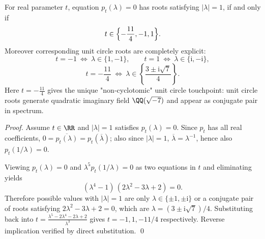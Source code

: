 

\begin{proposition}[Complete classification of unit circle spectral points: only three real parameters touch \texorpdfstring{$|\lambda|=1$}{|lambda|=1}]\label{prop:pom-a4t-unit-circle-spectrum-classification}
For real parameter \(t\), equation \(p_t(\lambda)=0\) has roots satisfying \(|\lambda|=1\), if and only if
\[
t\in\Bigl\{-\frac{11}{4},-1,1\Bigr\}.
\]
Moreover corresponding unit circle roots are completely explicit:
\[
t=-1\ \Longleftrightarrow\ \lambda\in\{1,-1\},
\qquad
t=1\ \Longleftrightarrow\ \lambda\in\{\mathrm{i},-\mathrm{i}\},
\]
\[
t=-\frac{11}{4}
\ \Longleftrightarrow\
\lambda\in\left\{\frac{3\pm \mathrm{i}\sqrt7}{4}\right\}.
\]
Here \(t=-\frac{11}{4}\) gives the unique "non-cyclotomic" unit circle touchpoint: unit circle roots generate quadratic imaginary field \(\QQ(\sqrt{-7})\) and appear as conjugate pair in spectrum.
\end{proposition}
\begin{proof}
Assume \(t\in\RR\) and \(|\lambda|=1\) satisfies \(p_t(\lambda)=0\).
Since \(p_t\) has all real coefficients, \(0=\overline{p_t(\lambda)}=p_t(\overline\lambda)\); also since \(|\lambda|=1\), \(\overline\lambda=\lambda^{-1}\), hence also \(p_t(1/\lambda)=0\).
\par
Viewing \(p_t(\lambda)=0\) and \(\lambda^5p_t(1/\lambda)=0\) as two equations in \(t\) and eliminating yields
\[
(\lambda^4-1)\,(2\lambda^2-3\lambda+2)=0.
\]
Therefore possible values with \(|\lambda|=1\) are only \(\lambda\in\{\pm1,\pm\mathrm{i}\}\) or a conjugate pair of roots satisfying \(2\lambda^2-3\lambda+2=0\), which are \(\lambda=(3\pm \mathrm{i}\sqrt7)/4\).
Substituting back into
\(
t=\frac{\lambda^5-2\lambda^4-2\lambda+2}{\lambda^3}
\)
gives \(t=-1,1,-11/4\) respectively.
Reverse implication verified by direct substitution. \qed
\end{proof}

